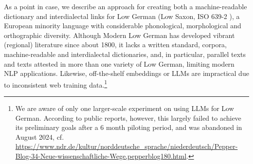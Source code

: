 As a point in case, we describe an approach for creating both a machine-readable dictionary and interdialectal links for Low German (Low Saxon, ISO 639-2 ), a European minority language with considerable phonological, morphological and orthographic diversity. Although Modern Low German has developed vibrant (regional) literature since about 1800, it lacks a written standard, corpora, machine-readable and interdialectal dictionaries, and, in particular, parallel texts and texts attested in more than one variety of Low German, limiting modern NLP applications. Likewise, off-the-shelf embeddings or LLMs are impractical due to inconsistent web training data.\footnote{
    We are aware of only one larger-scale experiment on using LLMs for Low German. According to public reports, however, this largely failed to achieve its preliminary goals after a 6 month piloting period, and was abandoned in August 2024, cf. \url{https://www.ndr.de/kultur/norddeutsche_sprache/niederdeutsch/Pepper-Blog-34-Neue-wissenschaftliche-Wege,pepperblog180.html}.
}

